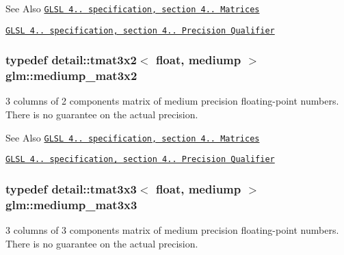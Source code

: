 \begin{DoxySeeAlso}{See Also}
\href{http://www.opengl.org/registry/doc/GLSLangSpec.4.20.8.pdf}{\tt G\-L\-S\-L 4.. specification, section 4.. Matrices} 

\href{http://www.opengl.org/registry/doc/GLSLangSpec.4.20.8.pdf}{\tt G\-L\-S\-L 4.. specification, section 4.. Precision Qualifier} 
\end{DoxySeeAlso}
\hypertarget{group__core__precision_ga1215b70c2750b6e9ab813ced8dcae568}{
\subsubsection[{mediump\-\_\-mat3x2}]{\setlength{\rightskip}{0pt plus 5cm}typedef detail\-::tmat3x2$<$ float, mediump $>$ {\bf glm\-::mediump\-\_\-mat3x2}}}\label{group__core__precision_ga1215b70c2750b6e9ab813ced8dcae568}
3 columns of 2 components matrix of medium precision floating-\/point numbers. There is no guarantee on the actual precision.

\begin{DoxySeeAlso}{See Also}
\href{http://www.opengl.org/registry/doc/GLSLangSpec.4.20.8.pdf}{\tt G\-L\-S\-L 4.. specification, section 4.. Matrices} 

\href{http://www.opengl.org/registry/doc/GLSLangSpec.4.20.8.pdf}{\tt G\-L\-S\-L 4.. specification, section 4.. Precision Qualifier} 
\end{DoxySeeAlso}
\hypertarget{group__core__precision_gae4c7f0d5d3dab712f9a671183e63e5ab}{
\subsubsection[{mediump\-\_\-mat3x3}]{\setlength{\rightskip}{0pt plus 5cm}typedef detail\-::tmat3x3$<$ float, mediump $>$ {\bf glm\-::mediump\-\_\-mat3x3}}}\label{group__core__precision_gae4c7f0d5d3dab712f9a671183e63e5ab}
3 columns of 3 components matrix of medium precision floating-\/point numbers. There is no guarantee on the actual precision.

